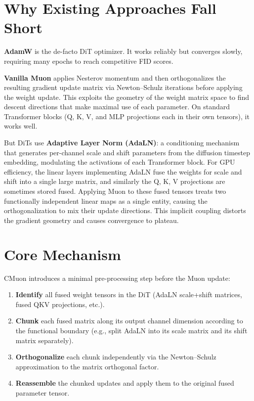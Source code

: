 \documentclass[10pt,twocolumn]{article}
\begin{document}
\section{Why Existing Approaches Fall Short}

\textbf{AdamW} is the de-facto DiT optimizer. It works reliably but converges slowly,
requiring many epochs to reach competitive FID scores.

\textbf{Vanilla Muon} applies Nesterov momentum and then orthogonalizes the resulting
gradient update matrix via Newton--Schulz iterations before applying the weight update.
This exploits the geometry of the weight matrix space to find descent directions that
make maximal use of each parameter. On standard Transformer blocks (Q, K, V, and MLP
projections each in their own tensors), it works well.

But DiTs use \textbf{Adaptive Layer Norm (AdaLN)}: a conditioning mechanism that
generates per-channel scale and shift parameters from the diffusion timestep embedding,
modulating the activations of each Transformer block. For GPU efficiency, the linear
layers implementing AdaLN fuse the weights for scale and shift into a single large
matrix, and similarly the Q, K, V projections are sometimes stored fused. Applying
Muon to these fused tensors treats two functionally independent linear maps as a single
entity, causing the orthogonalization to mix their update directions. This implicit
coupling distorts the gradient geometry and causes convergence to plateau.

\section{Core Mechanism}

CMuon introduces a minimal pre-processing step before the Muon update:

\begin{enumerate}[itemsep=2pt,parsep=0pt]
  \item \textbf{Identify} all fused weight tensors in the DiT (AdaLN scale+shift
    matrices, fused QKV projections, etc.).
  \item \textbf{Chunk} each fused matrix along its output channel dimension according
    to the functional boundary (e.g., split AdaLN into its scale matrix and its shift
    matrix separately).
  \item \textbf{Orthogonalize} each chunk independently via the Newton--Schulz
    approximation to the matrix orthogonal factor.
  \item \textbf{Reassemble} the chunked updates and apply them to the original
    fused parameter tensor.
\end{enumerate}
\end{document}
